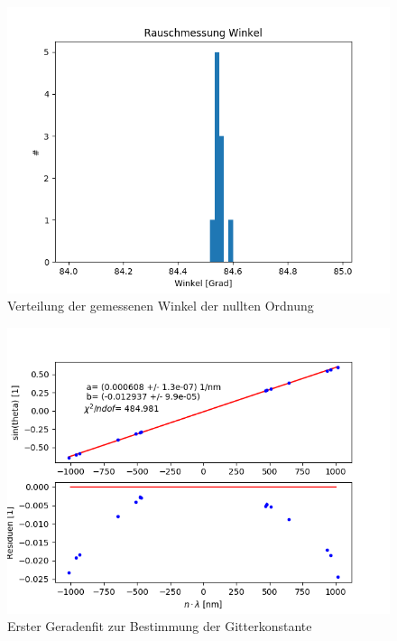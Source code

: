 \documentclass[12pt,a4paper]{article}
\begin{document}
	\begin{figure}
		\begin{center}
			\includegraphics[scale=0.7]{Bilder/Rauschmessung_Winkelmessung_Nullte_Ordnung.png}
		\end{center}
		\caption[Rauschmessung Winkelmessung]{Verteilung der gemessenen Winkel der nullten Ordnung}
		\label{fig:Rauschmessung_Winkel_Gitter}
	\end{figure}
	
	\begin{figure}
		\begin{center}
			\includegraphics[scale=0.9]{Bilder/First_Fit_Gitterkonstante.png}
		\end{center}
		\caption[Erster Fit Gitterkonstante]{Erster Geradenfit zur Bestimmung der Gitterkonstante}
		\label{fig:FirstFit_Gitterkonstante}
	\end{figure}
	
\end{document}
